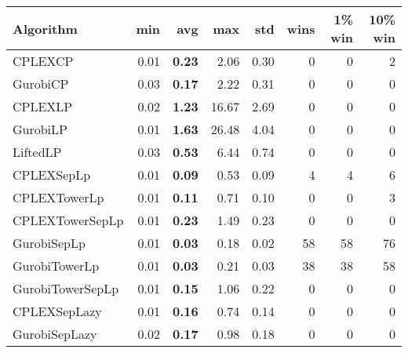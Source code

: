 \begin{tabular}{lrrrrrrr}
Algorithm & min & avg & max & std
& wins & 1\% win & 10\% win 
\\
\hline
CPLEXCP&0.01& \bf0.23& 2.06& 0.30&0&0&2\\
GurobiCP&0.03& \bf0.17& 2.22& 0.31&0&0&0\\
CPLEXLP&0.02& \bf1.23& 16.67& 2.69&0&0&0\\
GurobiLP&0.01& \bf1.63& 26.48& 4.04&0&0&0\\
LiftedLP&0.03& \bf0.53& 6.44& 0.74&0&0&0\\
CPLEXSepLp&0.01& \bf0.09& 0.53& 0.09&4&4&6\\
CPLEXTowerLp&0.01& \bf0.11& 0.71& 0.10&0&0&3\\
CPLEXTowerSepLp&0.01& \bf0.23& 1.49& 0.23&0&0&0\\
GurobiSepLp&0.01& \bf0.03& 0.18& 0.02&58&58&76\\
GurobiTowerLp&0.01& \bf0.03& 0.21& 0.03&38&38&58\\
GurobiTowerSepLp&0.01& \bf0.15& 1.06& 0.22&0&0&0\\
CPLEXSepLazy&0.01& \bf0.16& 0.74& 0.14&0&0&0\\
GurobiSepLazy&0.02& \bf0.17& 0.98& 0.18&0&0&0
\end{tabular}
